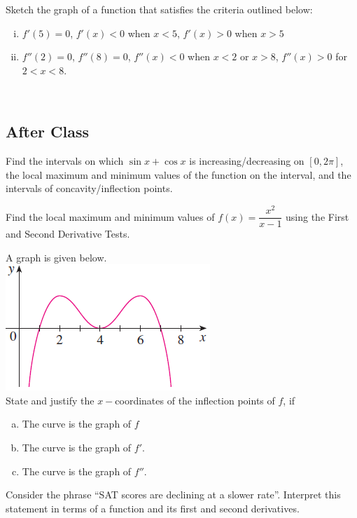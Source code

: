 \documentclass[notes]{subfiles}
\begin{document}
		\begin{ex}
			Sketch the graph of a function that satisfies the criteria outlined below:
				\begin{enumerate}[(i)]
					\item $f'(5) = 0$, $f'(x) < 0$ when $x < 5$, $f'(x) > 0$ when $x > 5$
					\item $f''(2) = 0$, $f''(8) = 0$, $f''(x) < 0 $ when $x < 2$ or $x > 8$, $f''(x) > 0$ for $2<x<8$.
				\end{enumerate}
		\end{ex}
			 $ $

		\newsec
			
	\subsection*{After Class}
		\begin{ex}
			Find the intervals on which $\sin x + \cos x$ is increasing/decreasing on $[0,2\pi]$, the local maximum and minimum values of the function on the interval, and the intervals of concavity/inflection points.
		\end{ex}
			
		\begin{ex}
			Find the local maximum and minimum values of $f(x) = \dfrac{x^2}{x-1}$ using the First and Second Derivative Tests.
		\end{ex}
			\newpage
			
		\begin{ex}
			A graph is given below.\\  
			\includegraphics{3.3fig3}\\
			State and justify the $x-$coordinates of the inflection points of $f$, if
			\begin{enumerate}[(a)]
				\item The curve is the graph of $f$
					
				\item The curve is the graph of $f'$.
					
				\item The curve is the graph of $f''$.
			\end{enumerate}
			
		\end{ex}
		
		\begin{ex}
			Consider the phrase ``SAT scores are declining at a slower rate''.  Interpret this statement in terms of a function and its first and second derivatives.
		\end{ex}
	\clearpage
\end{document}
